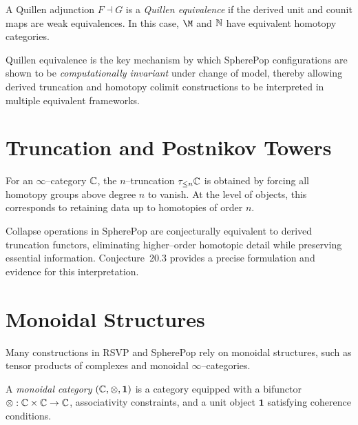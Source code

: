 \begin{definition}
A Quillen adjunction $F\dashv G$ is a \emph{Quillen equivalence} if the derived
unit and counit maps are weak equivalences.  In this case, $\M$ and $\mathbb{N}$ have
equivalent homotopy categories.
\end{definition}

\begin{remark}
Quillen equivalence is the key mechanism by which SpherePop configurations are
shown to be \emph{computationally invariant} under change of model, thereby
allowing derived truncation and homotopy colimit constructions to be interpreted
in multiple equivalent frameworks.
\end{remark}

\section{Truncation and Postnikov Towers}

\begin{definition}
For an $\infty$--category $\mathbb{C}$, the $n$--truncation $\tau_{\le n}\mathbb{C}$ is obtained
by forcing all homotopy groups above degree $n$ to vanish.  At the level of
objects, this corresponds to retaining data up to homotopies of order $n$.
\end{definition}

\begin{remark}
Collapse operations in SpherePop are conjecturally equivalent to derived
truncation functors, eliminating higher--order homotopic detail while
preserving essential information.  Conjecture~20.3 provides a precise
formulation and evidence for this interpretation.
\end{remark}

\section{Monoidal Structures}

Many constructions in RSVP and SpherePop rely on monoidal structures, such as
tensor products of complexes and monoidal $\infty$--categories.

\begin{definition}
A \emph{monoidal category} $(\mathbb{C},\otimes,\mathbf{1})$ is a category equipped with
a bifunctor $\otimes:\mathbb{C}\times\mathbb{C}\to\mathbb{C}$, associativity constraints, and a unit
object $\mathbf{1}$ satisfying coherence conditions.
\end{definition}

